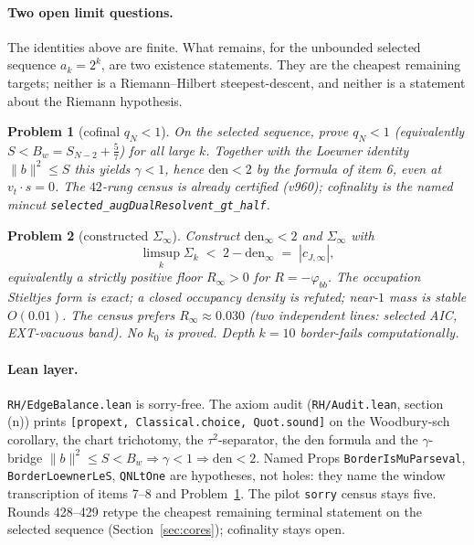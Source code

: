 \documentclass[11pt]{article}
\newtheorem{problem}{Problem}
\theoremstyle{remark}
\begin{document}
\paragraph{Two open limit questions.}
The identities above are finite.  What remains, for the unbounded
selected sequence $a_k=2^k$, are two existence statements.  They
are the cheapest remaining targets; neither is a Riemann--Hilbert
steepest-descent, and neither is a statement about the Riemann
hypothesis.

\begin{problem}[cofinal $q_N<1$]\label{prob:qn}
On the selected sequence, prove $q_N<1$ (equivalently
$S<B_w=S_{N-2}+\tfrac57$) for all large $k$.  Together with the
Loewner identity $\|b\|^2\le S$ this yields $\gamma<1$, hence
$\mathrm{den}<2$ by the formula of item 6, even at
$v_t\cdot s=0$.  The $42$-rung census is already certified
(v960); cofinality is the named mincut
\texttt{selected\_augDualResolvent\_gt\_half}.
\end{problem}

\begin{problem}[constructed $\Sigma_\infty$]\label{prob:siginf}
Construct $\mathrm{den}_\infty<2$ and $\Sigma_\infty$ with
\[
\limsup_k\Sigma_k
\;<\;
2-\mathrm{den}_\infty
\;=\;
|c_{J,\infty}|,
\]
equivalently a strictly positive floor $R_\infty>0$ for
$R=-\varphi_{bb}$.  The occupation Stieltjes form is exact; a
closed occupancy density is refuted; near-$1$ mass is stable
$O(0.01)$.  The census prefers $R_\infty\approx 0.030$
(two independent lines: selected AIC, EXT-vacuous band).
No $k_0$ is proved.  Depth $k=10$ border-fails computationally.
\end{problem}

\paragraph{Lean layer.}
\texttt{RH/EdgeBalance.lean} is sorry-free.  The axiom audit
(\texttt{RH/Audit.lean}, section (n)) prints
\texttt{[propext, Classical.choice, Quot.sound]} on the Woodbury-sch
corollary, the chart trichotomy, the $\tau^2$-separator, the den
formula and the $\gamma$-bridge
$\|b\|^2\le S<B_w\Rightarrow\gamma<1\Rightarrow\mathrm{den}<2$.
Named Props \texttt{BorderIsMuParseval}, \texttt{BorderLoewnerLeS},
\texttt{QNLtOne} are hypotheses, not holes: they name the
window transcription of items 7--8 and Problem~\ref{prob:qn}.
The pilot \texttt{sorry} census stays five.
Rounds 428--429 retype the cheapest remaining terminal
statement on the selected sequence
(Section~\ref{sec:cores}); cofinality stays open.
\end{document}
